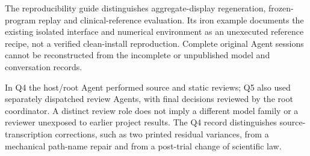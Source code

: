 \documentclass[11pt,letterpaper]{article}
\begin{document}
The reproducibility guide distinguishes aggregate-display regeneration, frozen-program replay and clinical-reference evaluation. Its iron example documents the existing isolated interface and numerical environment as an unexecuted reference recipe, not a verified clean-install reproduction. Complete original Agent sessions cannot be reconstructed from the incomplete or unpublished model and conversation records.


In Q4 the host/\allowbreak{}root Agent performed source and static reviews; Q5 also used separately dispatched review Agents, with final decisions reviewed by the root coordinator. A distinct review role does not imply a different model family or a reviewer unexposed to earlier project results. The Q4 record distinguishes source-transcription corrections, such as two printed residual variances, from a mechanical path-name repair and from a post-trial change of scientific law.
\end{document}
